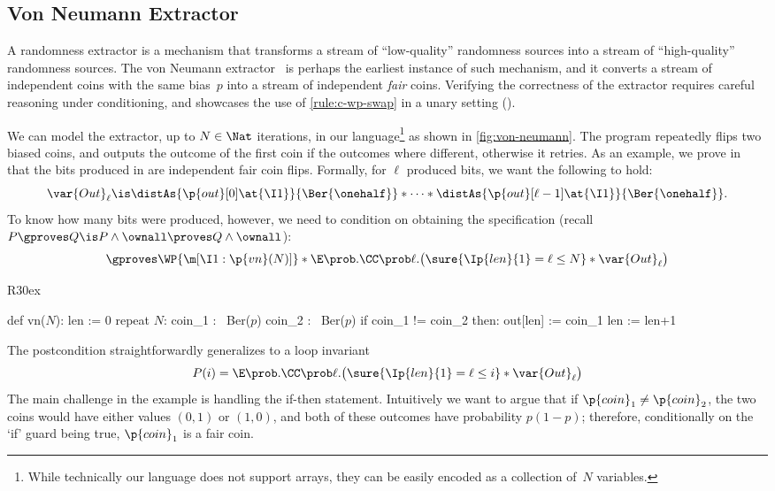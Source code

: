 \subsection{Von Neumann Extractor}
\label{sec:ex:von-neumann}

A randomness extractor is a mechanism that transforms a stream of
``low-quality'' randomness sources into a stream of ``high-quality''
randomness sources.
The von Neumann extractor~\cite{vonNeumann}
is perhaps the earliest instance of such mechanism,
and it converts a stream of independent coins with the same bias~$p$
into a stream of independent \emph{fair} coins.
Verifying the correctness of the extractor requires careful reasoning
under conditioning, and showcases the use of \cref{rule:c-wp-swap} in a
unary setting ().

We can model the extractor, up to $N \in \Nat$ iterations, in our language\footnote{While technically our language does not support arrays,
  they can be easily encoded as a collection of~$N$ variables.
}
as shown in \cref{fig:von-neumann}.
The program repeatedly flips two biased coins, and outputs the outcome of the first coin if the outcomes where different, otherwise it retries.
As an example, we prove in \thelogic~ that the bits produced in  are independent fair coin flips.
Formally, for $\ell$ produced bits, we want the following to hold:
\[
  \var{Out}_\ell \is
  \distAs{\p{out}[0]\at{\I1}}{\Ber{\onehalf}} *
  \dots *
  \distAs{\p{out}[\ell-1]\at{\I1}}{\Ber{\onehalf}}.
\]
To know how many bits were produced, however,
we need to condition on 
obtaining the specification
(recall $ P \gproves Q \is P \land \ownall \proves Q \land \ownall $):
\[
  \gproves \WP {\m[\I1: \p{vn}(N)]}*{
    \E \prob. \CC \prob \ell. \bigl(
      \sure{\Ip{len}{1} = \ell \leq N} *
      \var{Out}_\ell
    \bigr)
  }
\]

\begin{wrapfigure}[12]{R}{30ex}\begin{sourcecode*}[gobble=2,aboveskip=0pt,belowskip=0pt]
  def vn($N$):
    len := 0
    repeat $N$:
      coin_1 :~ Ber($p$)
      coin_2 :~ Ber($p$)
      if coin_1 != coin_2 then:
        out[len] := coin_1
        len := len+1
  \end{sourcecode*}
  \caption{Von Neumann extractor.}
  \label{fig:von-neumann}
\end{wrapfigure}

The postcondition straightforwardly generalizes to a loop invariant
\[
  P(i) =
  \E \prob. \CC \prob \ell. \bigl(
    \sure{\Ip{len}{1} = \ell \leq i} *
    \var{Out}_\ell
  \bigr)
\]
The main challenge in the example is handling the if-then statement.
Intuitively we want to argue that if $ \p{coin}_1 \ne \p{coin}_2 $,
the two coins would have either values $(0,1)$ or $(1,0)$,
and both of these outcomes have probability $ p(1-p) $;
therefore,
conditionally on the `if' guard being true,
$\p{coin}_1$ is a fair coin.

